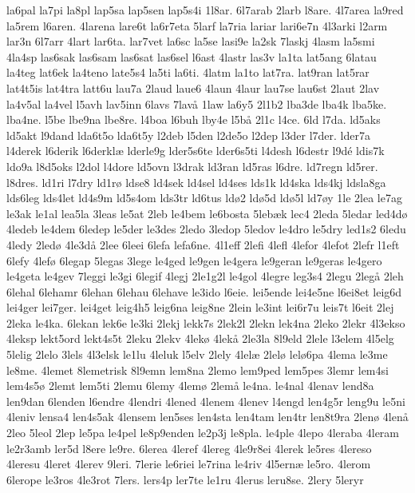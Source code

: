 la6pal
la7pi
la8pl
lap5sa
lap5sen
lap5s4i
1l8ar.
6l7arab
2larb
l8are.
4l7area
la9red
la5rem
l6aren.
4larena
lare6t
la6r7eta
5larf
la7ria
lariar
lari6e7n
4l3arki
l2arm
lar3n
6l7arr
4lart
lar6ta.
lar7vet
la6sc
la5se
lasi9e
la2sk
7laskj
4lasm
la5smi
4la4sp
las6sak
las6sam
las6sat
las6sel
l6ast
4lastr
las3v
la1ta
lat5ang
6latau
la4teg
lat6ek
la4teno
late5s4
la5ti
la6ti.
4latm
la1to
lat7ra.
lat9ran
lat5rar
lat4t5is
lat4tra
latt6u
lau7a
2laud
laue6
4laun
4laur
lau7se
lau6st
2laut
2lav
la4v5al
la4vel
l5avh
lav5inn
6lavs
7lav^^e5
1law
la6y5
2l1b2
lba3de
lba4k
lba5ke.
lba4ne.
l5be
lbe9na
lbe8re.
l4boa
l6buh
lby4e
l5b^^e5
2l1c
l4ce.
6ld
l7da.
ld5aks
ld5akt
l9dand
lda6t5o
lda6t5y
l2deb
l5den
l2de5o
l2dep
l3der
l7der.
lder7a
l4derek
l6derik
l6derkl^^e6
lderle9g
lder5s6te
lder6s5ti
l4desh
l6destr
l9d^^e9
ldis7k
ldo9a
l8d5oks
l2dol
l4dore
ld5ovn
l3drak
ld3ran
ld5ras
l6dre.
ld7regn
ld5rer.
l8dres.
ld1ri
l7dry
ld1r^^f8
ldse8
ld4sek
ld4sel
ld4ses
lds1k
ld4ska
lds4kj
ldsla8ga
lds6leg
lds4let
ld4s9m
ld5s4om
lds3tr
ld6tus
ld^^f82
ld^^f85d
ld^^f85l
ld7^^f8y
1le
2lea
le7ag
le3ak
le1al
lea5la
3leas
le5at
2leb
le4bem
le6bosta
5leb^^e6k
lec4
2leda
5ledar
led4d^^f8
4ledeb
le4dem
6ledep
le5der
le3des
2ledo
3ledop
5ledov
le4dro
le5dry
led1s2
6ledu
4ledy
2led^^f8
4le3d^^e5
2lee
6leei
6lefa
lefa6ne.
4l1eff
2lefi
4lefl
4lefor
4lefot
2lefr
l1eft
6lefy
4lef^^f8
6legap
5legas
3lege
le4ged
le9gen
le4gera
le9geran
le9geras
le4gero
le4geta
le4gev
7leggi
le3gi
6legif
4legj
2le1g2l
le4gol
4legre
leg3s4
2legu
2leg^^e5
2leh
6lehal
6lehamr
6lehan
6lehau
6lehave
le3ido
l6eie.
lei5ende
lei4e5ne
l6ei8et
leig6d
lei4ger
lei7ger.
lei4get
leig4h5
leig6na
leig8ne
2lein
le3int
lei6r7u
leis7t
l6eit
2lej
2leka
le4ka.
6lekan
lek6e
le3ki
2lekj
lekk7s
2lek2l
2lekn
lek4na
2leko
2lekr
4l3ekso
4leksp
lekt5ord
lekt4s5t
2leku
2lekv
4lek^^f8
4lek^^e5
2le3la
8l9eld
2lele
l3elem
4l5elg
5lelig
2lelo
3lels
4l3elsk
le1lu
4leluk
l5elv
2lely
4lel^^e6
2lel^^f8
lel^^f86pa
4lema
le3me
le8me.
4lemet
8lemetrisk
8l9emn
lem8na
2lemo
lem9ped
lem5pes
3lemr
lem4si
lem4s5^^f8
2lemt
lem5ti
2lemu
6lemy
4lem^^f8
2lem^^e5
le4na.
le4nal
4lenav
lend8a
len9dan
6lenden
l6endre
4lendri
4lened
4lenem
4lenev
l4engd
len4g5r
leng9u
le5ni
4leniv
lensa4
len4s5ak
4lensem
len5ses
len4sta
len4tam
len4tr
len8t9ra
2len^^f8
4len^^e5
2leo
5leol
2lep
le5pa
le4pel
le8p9enden
le2p3j
le8pla.
le4ple
4lepo
4leraba
4leram
le2r3amb
ler5d
l8ere
le9re.
6lerea
4leref
4lereg
4le9r8ei
4lerek
le5res
4lereso
4leresu
4leret
4lerev
9leri.
7lerie
le6riei
le7rina
le4riv
4l5ern^^e6
le5ro.
4lerom
6lerope
le3ros
4le3rot
7lers.
lers4p
ler7te
le1ru
4lerus
leru8se.
2lery
5leryr
